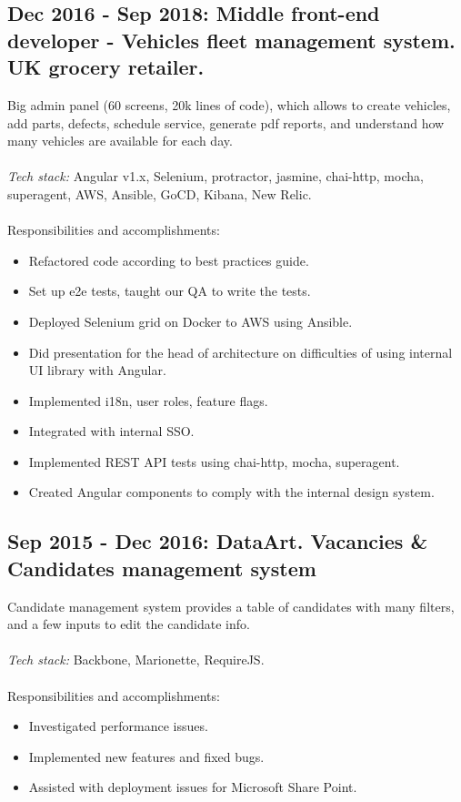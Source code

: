 \documentclass[a4paper, 14pt]{article}
\begin{document}
  \subsection{Dec 2016 - Sep 2018: Middle front-end developer - Vehicles fleet management system. UK grocery retailer.
}
  Big admin panel (60 screens, 20k lines of code), which allows to create vehicles, add parts, defects, schedule service, generate pdf reports, and understand how many vehicles are available for each day. \\
  \\
  \textit{Tech stack:} Angular v1.x, Selenium, protractor, jasmine, chai-http, mocha, superagent, AWS, Ansible, GoCD, Kibana, New Relic.
  \\
  \\
  Responsibilities and accomplishments:
    \begin{itemize}
      \item Refactored code according to best practices guide. \\
      \item Set up e2e tests, taught our QA to write the tests. \\
      \item Deployed Selenium grid on Docker to AWS using Ansible. \\
      \item Did presentation for the head of architecture on difficulties of using internal UI library with Angular. \\
      \item Implemented i18n, user roles, feature flags. \\
      \item Integrated with internal SSO. \\
      \item Implemented REST API tests using chai-http, mocha, superagent. \\
      \item Created Angular components to comply with the internal design system.
    \end{itemize}
    \bigskip

  \subsection{Sep 2015 - Dec 2016: DataArt. Vacancies \& Candidates management system}
  Candidate management system provides a table of candidates with many filters, and a few inputs to edit the candidate info. \\
  \\
    \textit{Tech stack:} Backbone, Marionette, RequireJS. \\
  \\
  Responsibilities and accomplishments:
    \begin{itemize}
      \item Investigated performance issues. \\
      \item Implemented new features and fixed bugs. \\
      \item Assisted with deployment issues for Microsoft Share Point.
    \end{itemize}
\end{document}

